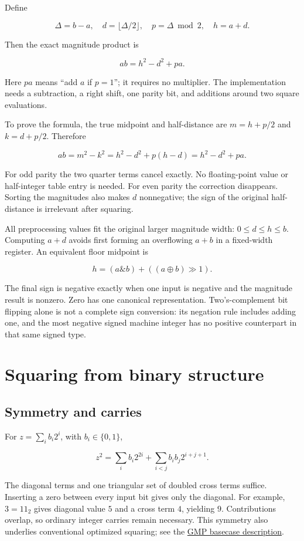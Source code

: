 \documentclass[11pt,a4paper]{article}
\begin{document}
Define

\[
\Delta=b-a,\quad d=\lfloor\Delta/2\rfloor,\quad p=\Delta\bmod 2,\quad h=a+d.
\]

Then the exact magnitude product is

\[
\boxed{ab=h^2-d^2+pa.}
\]

Here $pa$ means ``add $a$ if $p=1$''; it requires no multiplier. The implementation needs a subtraction, a right shift, one parity bit, and additions around two square evaluations.

To prove the formula, the true midpoint and half-distance are $m=h+p/2$ and $k=d+p/2$. Therefore

\[
ab=m^2-k^2=h^2-d^2+p(h-d)=h^2-d^2+pa.
\]

For odd parity the two quarter terms cancel exactly. No floating-point value or half-integer table entry is needed. For even parity the correction disappears. Sorting the magnitudes also makes $d$ nonnegative; the sign of the original half-distance is irrelevant after squaring.

All preprocessing values fit the original larger magnitude width: $0\le d\le h\le b$. Computing $a+d$ avoids first forming an overflowing $a+b$ in a fixed-width register. An equivalent floor midpoint is

\[
h=(a\mathbin{\&}b)+((a\mathbin{\oplus}b)\gg1).
\]

The final sign is negative exactly when one input is negative and the magnitude result is nonzero. Zero has one canonical representation. Two's-complement bit flipping alone is not a complete sign conversion: its negation rule includes adding one, and the most negative signed machine integer has no positive counterpart in that same signed type.

\section{Squaring from binary structure}

\subsection{Symmetry and carries}

For $z=\sum_i b_i2^i$, with $b_i\in\{0,1\}$,

\[
z^2=\sum_i b_i2^{2i}+\sum_{i<j}b_ib_j2^{i+j+1}.
\]

The diagonal terms and one triangular set of doubled cross terms suffice. Inserting a zero between every input bit gives only the diagonal. For example, $3=11_2$ gives diagonal value $5$ and a cross term $4$, yielding $9$. Contributions overlap, so ordinary integer carries remain necessary. This symmetry also underlies conventional optimized squaring; see the \href{\detokenize{https://gmplib.org/manual/Basecase-Multiplication}}{GMP basecase description}.
\end{document}

